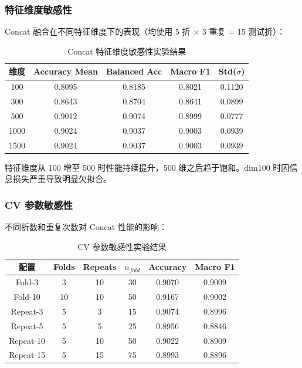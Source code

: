 \subsubsection{特征维度敏感性}

Concat 融合在不同特征维度下的表现（均使用 5 折 $\times$ 3 重复 = 15 测试折）：

\begin{table}[H]
\centering
\caption{Concat 特征维度敏感性实验结果}
\label{tab:dim-sensitivity}
\begin{tabular}{ccccc}
\toprule
维度 & Accuracy Mean & Balanced Acc & Macro F1 & Std($\sigma$) \\
\midrule
100 & 0.8095 & 0.8185 & 0.8021 & 0.1120 \\
300 & 0.8643 & 0.8704 & 0.8641 & 0.0899 \\
500 & 0.9012 & 0.9074 & 0.8999 & 0.0777 \\
1000 & 0.9024 & 0.9037 & 0.9003 & 0.0939 \\
1500 & 0.9024 & 0.9037 & 0.9003 & 0.0939 \\
\bottomrule
\end{tabular}
\end{table}

特征维度从 100 增至 500 时性能持续提升，500 维之后趋于饱和。dim100 时因信息损失严重导致明显欠拟合。

\subsubsection{CV 参数敏感性}

不同折数和重复次数对 Concat 性能的影响：

\begin{table}[H]
\centering
\caption{CV 参数敏感性实验结果}
\label{tab:cv-sensitivity}
\begin{tabular}{cccccc}
\toprule
配置 & Folds & Repeats & $n_{fold}$ & Accuracy & Macro F1 \\
\midrule
Fold-3 & 3 & 10 & 30 & 0.9070 & 0.9009 \\
Fold-10 & 10 & 10 & 50 & 0.9167 & 0.9002 \\
Repeat-3 & 5 & 3 & 15 & 0.9074 & 0.8996 \\
Repeat-5 & 5 & 5 & 25 & 0.8956 & 0.8846 \\
Repeat-10 & 5 & 10 & 50 & 0.9022 & 0.8909 \\
Repeat-15 & 5 & 15 & 75 & 0.8993 & 0.8896 \\
\bottomrule
\end{tabular}
\end{table}

